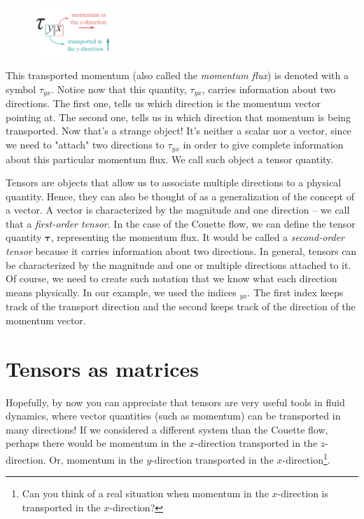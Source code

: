 \documentclass[10pt,twocolumn]{article}
\begin{document}
\begin{figure}
\centering\includegraphics[width=3cm]{tau_y_x.pdf}
\label{fig:tau_y_x}
\end{figure}
This transported momentum (also called the \textit{momentum flux}) is denoted with a symbol $\tau_{yx}$. Notice now that this quantity, $\tau_{yx}$, carries information about two directions. The first one, tells us which direction is the momentum vector pointing at. The second one, tells us in which direction that momentum is being transported. Now that's a strange object! It's neither a scalar nor a vector, since we need to "attach" two directions to $\tau_{yx}$ in order to give complete information about this particular momentum flux. We call such object a tensor quantity.

Tensors are objects that allow us to associate multiple directions to a physical quantity. Hence, they can also be thought of as a generalization of the concept of a vector. A vector is characterized by the magnitude and one direction -- we call that a \textit{first-order tensor}. In the case of the Couette flow, we can define the tensor quantity $\bm{\tau}$, representing the momentum flux. It would be called a \textit{second-order tensor} because it carries information about two directions. In general, tensors can be characterized by the magnitude and one or multiple directions attached to it. Of course, we need to create such notation that we know what each direction means physically. In our example, we used the indices $_{yx}$. The first index keeps track of the transport direction and the second keeps track of the direction of the momentum vector.

\section*{Tensors as matrices}

Hopefully, by now you can appreciate that tensors are very useful tools in fluid dynamics, where vector quantities (such as momentum) can be transported in many directions!
If we considered a different system than the Couette flow, perhaps there would be momentum in the $x$-direction transported in the $z$-direction. Or, momentum in the $y$-direction transported in the $x$-direction\footnote{Can you think of a real situation when momentum in the $x$-direction is transported in the $x$-direction?}.
\end{document}
